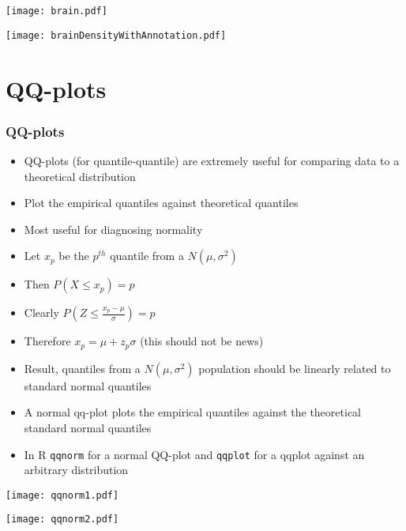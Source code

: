 \documentclass[aspectratio=169]{beamer}
\begin{document}
\begin{frame}
\texttt{[image: brain.pdf]}
\end{frame}

\begin{frame}
\texttt{[image: brainDensityWithAnnotation.pdf]}
\end{frame}

\section{QQ-plots}
\begin{frame}\frametitle{QQ-plots}
\begin{itemize}
\item QQ-plots (for quantile-quantile) are extremely useful
  for comparing data to a theoretical distribution
\item Plot the empirical quantiles against theoretical quantiles
\item Most useful for diagnosing normality
\end{itemize}
\end{frame}

\begin{frame}
\begin{itemize}
\item Let $x_p$ be the $p^{th}$ quantile from a $N(\mu, \sigma^2)$
\item Then $P(X \leq x_p) = p$
\item Clearly $P(Z \leq \frac{x_p - \mu}{\sigma}) = p$
\item Therefore $x_p = \mu + z_p \sigma$ (this should not be news)
\item Result, quantiles from a $N(\mu,\sigma^2)$ population should
  be linearly related to standard normal quantiles
\item A normal qq-plot plots the empirical quantiles against the
  theoretical standard normal quantiles
\item In R \texttt{qqnorm} for a normal QQ-plot and  \texttt{qqplot}
  for a qqplot against an arbitrary distribution
\end{itemize}
\end{frame}

\begin{frame}
\texttt{[image: qqnorm1.pdf]}
\end{frame}

\begin{frame}
\texttt{[image: qqnorm2.pdf]}
\end{frame}
\end{document}

